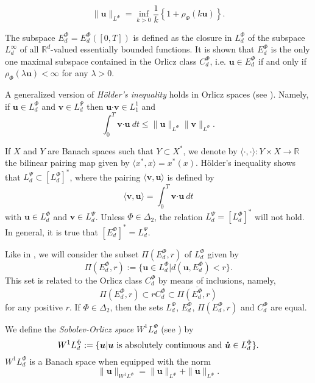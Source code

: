 \documentclass[twoside]{elsarticle}
\theoremstyle{remark}
\newcommand{\orlnor}{\|_{L^{\Phi}}}
\newcommand{\lphi}{L^{\Phi}}
\newcommand{\lpsi}{L^{\Psi}}
\newcommand{\ephi}{E^{\Phi}}
\newcommand{\claseor}{C^{\Phi}}
\newcommand{\wphi}{W^{1}\lphi}
\renewcommand{\b}[1]{\boldsymbol{#1}}
\newcommand{\ccdot}{\b{\cdot}}
\renewcommand{\leq}{\leqslant}
\begin{document}
\begin{equation}\label{amemiya}
\|\b{u}\orlnor=\inf\limits_{k>0}\frac{1}{k}\left\{1+\rho_{\Phi}(k\b{u})\right\}.
\end{equation}



The subspace $\ephi_d=\ephi_d([0,T])$ is defined as the closure in $\lphi_d$ of the subspace $L^{\infty}_d$ of all $\mathbb{R}^d$-valued essentially bounded functions. It is shown that  $\ephi_d$ is the only one maximal subspace contained in the Orlicz class $\claseor_d$, i.e. 
$\b{u}\in\ephi_d$ if and only if $\rho_{\Phi}(\lambda \b{u})<\infty$ for any $\lambda>0$.  

A generalized version of \emph{H\"older's inequality} holds in Orlicz spaces (see \cite[Th. 9.3]{KR}). Namely, if $\b{u}\in\lphi_d$ and $\b{v}\in\lpsi_d$ then $\b{u}\ccdot\b{v}\in L_1^1$ and
\begin{equation}\label{holder}
\int_0^T\b{v}\ccdot\b{u}\ dt\leq \|\b{u}\orlnor\|\b{v}\|_{L^{\Psi}}.
\end{equation}




If $X$ and $Y$ are  Banach spaces such that  $Y\subset X^*$, we denote by $\langle\cdot,\cdot\rangle:Y\times X\to\mathbb{R}$ the bilinear pairing  map given by $\langle x^*,x\rangle=x^*(x)$. H\"older's inequality shows that $\lpsi_d\subset \left[\lphi_d\right]^*$, where the pairing  
$\langle \b{v}, \b{u}\rangle$
is defined by 
\begin{equation}\label{pairing}
  \langle \b{v},\b{u}\rangle=\int_0^T\b{v}\ccdot\b{u}\ dt
\end{equation}
with  $\b{u}\in\lphi_d$ and $\b{v}\in\lpsi_d$.
 Unless $\Phi \in \Delta_2$, the relation $\lpsi_d= \left[\lphi_d\right]^*$ will not hold. In general, it is true  that  $\left[\ephi_d\right]^*=\lpsi_d$.


Like in \cite{KR}, we will consider the subset $\Pi(\ephi_d,r)$ of $\lphi_d$ given by
\[\Pi(\ephi_d,r):=\{\b{u}\in\lphi_d| d(\b{u},\ephi_d)<r\}.\]
This set is related to the Orlicz class $\claseor_d$ by means of inclusions, namely,
\begin{equation}\label{inclusiones}\Pi(\ephi_d, r )\subset r \claseor_d\subset\overline{\Pi(\ephi_d,r)}
\end{equation}
for any positive $r$.
If $\Phi \in \Delta_2$,  then the sets $\lphi_d$, $\ephi_d$, $\Pi(\ephi_d,r)$ and $\claseor_d$ are equal.



We define the \emph{Sobolev-Orlicz space} $\wphi_d$ (see \cite{adams_sobolev}) by
\[\wphi_d:=\{\b{u}| \b{u} \hbox{ is absolutely continuous and } \b{\dot{u}}\in \lphi_d\}.\]
$\wphi_d$ is a Banach space when equipped with the norm
\[
\|  \b{u}  \|_{\wphi}= \|  \b{u}  \|_{\lphi} + \|\b{\dot{u}}\orlnor.
\]
\end{document}
